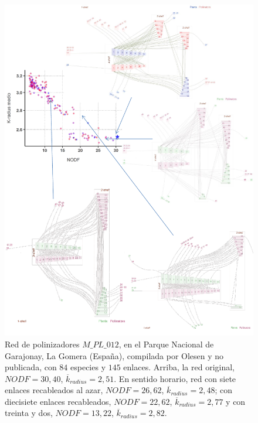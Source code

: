 \clearpage
\begin{figure}[ht!]
\centering
\includegraphics[scale=0.80]{Figures/VIS_PL_012.pdf}
\caption {Red de polinizadores $M\_PL\_012$, en el Parque Nacional de Garajonay, La Gomera (España), compilada por Olesen y no publicada, con $84$ especies y $145$ enlaces. Arriba, la red original, $NODF = 30,40$, $\overline k_{radius} = 2,51$. En sentido horario, red con siete enlaces recableados al azar, $NODF = 26,62$, $\overline k_{radius} = 2,48$; con diecisiete enlaces recableados, $NODF = 22,62$, $\overline k_{radius} = 2,77$ y con treinta y dos, $NODF = 13,22$, $\overline k_{radius} = 2,82$.}
\label{fig:VIS_PL_012}
\end{figure}

